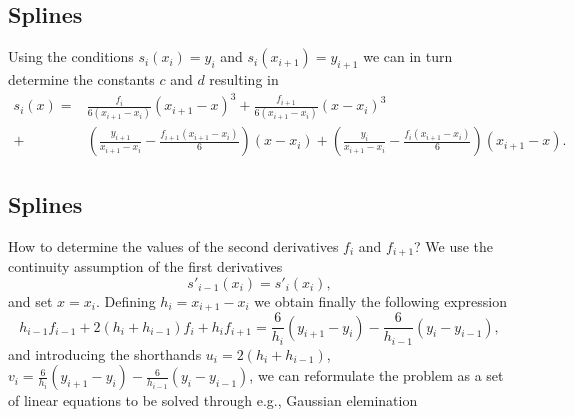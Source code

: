 \documentclass[%
twoside,                 %
final,                   %
10pt]{article}
\begin{document}
{{{{{{{%
\subsection{Splines}
\begin{block}{}
Using the conditions $s_i(x_i)=y_i$ and $s_i(x_{i+1})=y_{i+1}$ 
we can in turn determine the constants $c$ and $d$ resulting in
\begin{eqnarray}
   s_i(x) =&\frac{f_i}{6(x_{i+1}-x_i)}(x_{i+1}-x)^3+
               \frac{f_{i+1}}{6(x_{i+1}-x_i)}(x-x_i)^3 \nonumber  \\ 
            +&(\frac{y_{i+1}}{x_{i+1}-x_i}-\frac{f_{i+1}(x_{i+1}-x_i)}{6})
              (x-x_i)+
             (\frac{y_{i}}{x_{i+1}-x_i}-\frac{f_{i}(x_{i+1}-x_i)}{6})
             (x_{i+1}-x).
\end{eqnarray}
\end{block}


\subsection{Splines}
\begin{block}{}
How to determine the values of the second
derivatives $f_{i}$ and $f_{i+1}$? We use the continuity assumption 
of the first derivatives 
\[
    s'_{i-1}(x_i)= s'_i(x_i),
\]
and set $x=x_i$. Defining $h_i=x_{i+1}-x_i$ we obtain finally
the following expression
\[
   h_{i-1}f_{i-1}+2(h_{i}+h_{i-1})f_i+h_if_{i+1}=
   \frac{6}{h_i}(y_{i+1}-y_i)-\frac{6}{h_{i-1}}(y_{i}-y_{i-1}),
\]
and introducing the shorthands $u_i=2(h_{i}+h_{i-1})$, 
$v_i=\frac{6}{h_i}(y_{i+1}-y_i)-\frac{6}{h_{i-1}}(y_{i}-y_{i-1})$,
we can reformulate the problem as a set of linear equations to be 
solved  through e.g., Gaussian elemination
\end{block}


}}}}}}}
\end{document}
